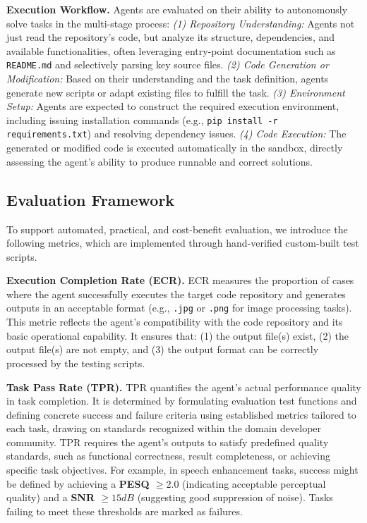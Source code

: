 \documentclass[letterpaper]{article} %
\begin{document}
\textbf{Execution Workflow.}
Agents are evaluated on their ability to autonomously solve tasks in the multi-stage process: 
\textit{(1) Repository Understanding:} Agents not just read the repository's code, but analyze its structure, dependencies, and available functionalities, often leveraging entry-point documentation such as \texttt{README.md} and selectively parsing key source files.
\textit{(2) Code Generation or Modification:} Based on their understanding and the task definition, agents generate new scripts or adapt existing files to fulfill the task.
\textit{(3) Environment Setup:} Agents are expected to construct the required execution environment, including issuing installation commands (e.g., \texttt{pip install -r requirements.txt}) and resolving dependency issues.
\textit{(4) Code Execution:} The generated or modified code is executed automatically in the sandbox, directly assessing the agent's ability to produce runnable and correct solutions.


\subsection{Evaluation Framework}
To support automated, practical, and cost-benefit evaluation, we introduce the following metrics, which are implemented through hand-verified custom-built test scripts.

\textbf{Execution Completion Rate (ECR).} ECR measures the proportion of cases where the agent successfully executes the target code repository and generates outputs in an acceptable format (e.g., \texttt{.jpg} or \texttt{.png} for image processing tasks). This metric reflects the agent's compatibility with the code repository and its basic operational capability. It ensures that: (1) the output file(s) exist, (2) the output file(s) are not empty, and (3) the output format can be correctly processed by the testing scripts.

\textbf{Task Pass Rate (TPR).} TPR quantifies the agent's actual performance quality in task completion. It is determined by formulating evaluation test functions and defining concrete success and failure criteria using established metrics tailored to each task, drawing on standards recognized within the domain developer community. TPR requires the agent's outputs to satisfy predefined quality standards, such as functional correctness, result completeness, or achieving specific task objectives. For example, in speech enhancement tasks, success might be defined by achieving a \textbf{PESQ $\ge 2.0$} (indicating acceptable perceptual quality) and a \textbf{SNR $\ge 15 dB$} (suggesting good suppression of noise). Tasks failing to meet these thresholds are marked as failures.
\end{document}
